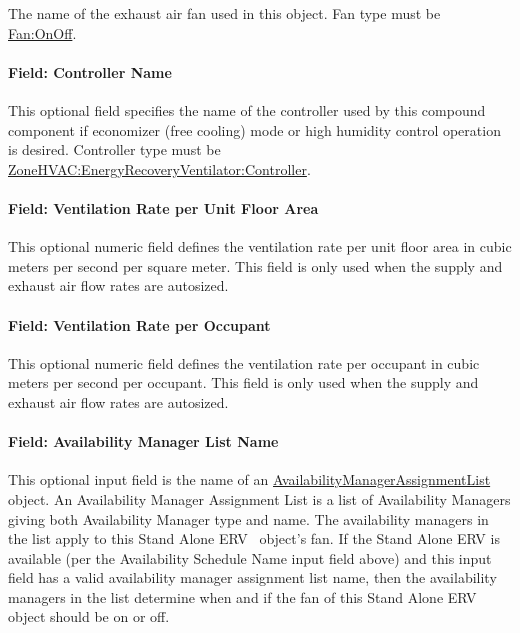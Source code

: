 The name of the exhaust air fan used in this object. Fan type must be \hyperref[fanonoff]{Fan:OnOff}.

\paragraph{Field: Controller Name}\label{field-controller-name}

This optional field specifies the name of the controller used by this compound component if economizer (free cooling) mode or high humidity control operation is desired. Controller type must be \hyperref[zonehvacenergyrecoveryventilatorcontroller]{ZoneHVAC:EnergyRecoveryVentilator:Controller}.

\paragraph{Field: Ventilation Rate per Unit Floor Area}\label{field-ventilation-rate-per-unit-floor-area}

This optional numeric field defines the ventilation rate per unit floor area in cubic meters per second per square meter. This field is only used when the supply and exhaust air flow rates are autosized.

\paragraph{Field: Ventilation Rate per Occupant}\label{field-ventilation-rate-per-occupant}

This optional numeric field defines the ventilation rate per occupant in cubic meters per second per occupant. This field is only used when the supply and exhaust air flow rates are autosized.

\paragraph{Field: Availability Manager List Name}\label{field-availability-manager-list-name-9}

This optional input field is the name of an \hyperref[availabilitymanagerassignmentlist]{AvailabilityManagerAssignmentList} object. An Availability Manager Assignment List is a list of Availability Managers giving both Availability Manager type and name. The availability managers in the list apply to this Stand Alone ERV~ object's fan. If the Stand Alone ERV is available (per the Availability Schedule Name input field above) and this input field has a valid availability manager assignment list name, then the availability managers in the list determine when and if the fan of this Stand Alone ERV~ object should be on or off.

